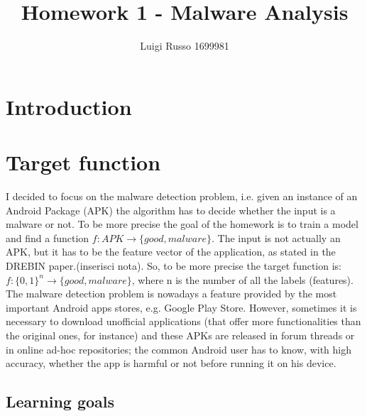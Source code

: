 \documentclass[12pt]{article}
\title{Homework 1 - Malware Analysis}
\author{Luigi Russo 1699981}
\begin{document}
	
\maketitle
	
\section{Introduction}

\section{Target function}
I decided to focus on the malware detection problem, i.e. given an instance of an Android Package (APK) the algorithm has to decide whether the input is a malware or not. To be more precise the goal of the homework is to train a model and find a function
$ f: APK \rightarrow \{good, malware\} $.
The input is not actually an APK, but it has to be the feature vector of the application, as stated in the DREBIN paper.(inserisci nota). So, to be more precise the target function is:
$ f: \{0,1\}^n  \rightarrow \{good, malware\} $, where n is the number of all the labels (features).
The malware detection problem is nowadays a feature provided by the most important Android apps stores, e.g. Google Play Store. However, sometimes it is necessary to download unofficial applications (that offer more functionalities than the original ones, for instance) and these APKs are released in forum threads or in online ad-hoc repositories; the common Android user has to know, with high accuracy, whether the app is harmful or not before running it on his device.

\subsection{Learning goals}
\end{document}
